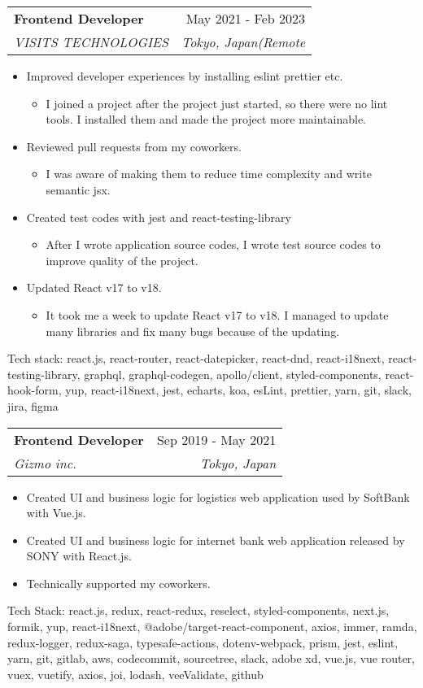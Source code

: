 \documentclass[letterpaper,11pt]{article}
\makeatletter
\newcommand{\resumeItem}[1]{
  \item\large{
    {#1 \vspace{0pt}}
  }
}
\newcommand{\resumeSubheading}[4]{
  \vspace{-2pt}\item
    \begin{tabular*}{0.97\textwidth}[t]{l@{\extracolsep{\fill}}r}
      \textbf{#1} & #2 \\
      \textit{\small#3} & \textit{\small #4} \\
    \end{tabular*}\vspace{-7pt}
}
\makeatother
\begin{document}
    \resumeSubheading
      {Frontend Developer}{May 2021 - Feb 2023}
      {VISITS TECHNOLOGIES}{Tokyo, Japan(Remote}
      \begin{itemize}
        \resumeItem{Improved developer experiences by installing eslint prettier etc.}
        \begin{itemize}
          \item {I joined a project after the project just started, so there were no lint tools. I installed them and made the project more maintainable.}
        \end{itemize}
        \resumeItem{Reviewed pull requests from my coworkers.}
        \begin{itemize}
          \item {I was aware of making them to reduce time complexity and write semantic jsx.}
        \end{itemize}
        \resumeItem{Created test codes with jest and react-testing-library}
        \begin{itemize}
          \item {After I wrote application source codes, I wrote test source codes to improve quality of the project.}
        \end{itemize}
        \resumeItem{Updated React v17 to v18.}
        \begin{itemize}
          \item {It took me a week to update React v17 to v18. I managed to update many libraries and fix many bugs because of the updating.}
        \end{itemize}
      \end{itemize}
      {Tech stack: react.js, react-router, react-datepicker, react-dnd, react-i18next, react-testing-library, graphql, graphql-codegen, apollo/client, styled-components, react-hook-form, yup, react-i18next, jest, echarts, koa, esLint, prettier, yarn, git, slack, jira, figma}

    \resumeSubheading
      {Frontend Developer}{Sep 2019 - May 2021}
      {Gizmo inc.}{Tokyo, Japan}
      \begin{itemize}
        \resumeItem{Created UI and business logic for logistics web application used by SoftBank with Vue.js.}
        \resumeItem{Created UI and business logic for internet bank web application released by SONY with React.js.}
        \resumeItem{Technically supported my coworkers.}
      \end{itemize}
      {Tech Stack: react.js, redux, react-redux, reselect, styled-components, next.js, formik, yup, react-i18next, @adobe/target-react-component, axios, immer, ramda, redux-logger, redux-saga, typesafe-actions, dotenv-webpack, prism, jest, eslint, yarn, git, gitlab, aws, codecommit, sourcetree, slack, adobe xd, vue.js, vue router, vuex, vuetify, axios, joi, lodash, veeValidate, github}
\end{document}
